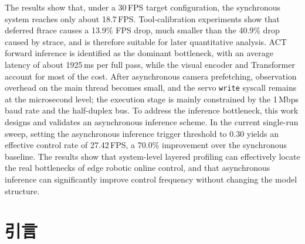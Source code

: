 \documentclass[12pt, a4paper, fontset=macnew]{ctexart}
\begin{document}
The results show that, under a 30\,FPS target configuration, the synchronous system reaches only about 18.7\,FPS. Tool-calibration experiments show that deferred ftrace causes a 13.9\% FPS drop, much smaller than the 40.9\% drop caused by strace, and is therefore suitable for later quantitative analysis. ACT forward inference is identified as the dominant bottleneck, with an average latency of about 1925\,ms per full pass, while the visual encoder and Transformer account for most of the cost. After asynchronous camera prefetching, observation overhead on the main thread becomes small, and the servo \texttt{write} syscall remains at the microsecond level; the execution stage is mainly constrained by the 1\,Mbps baud rate and the half-duplex bus. To address the inference bottleneck, this work designs and validates an asynchronous inference scheme. In the current single-run sweep, setting the asynchronous inference trigger threshold to 0.30 yields an effective control rate of 27.42\,FPS, a 70.0\% improvement over the synchronous baseline. The results show that system-level layered profiling can effectively locate the real bottlenecks of edge robotic online control, and that asynchronous inference can significantly improve control frequency without changing the model structure.

\vspace{1.5em}

\clearpage

\tableofcontents
\clearpage

\mbox{}
\thispagestyle{empty}
\clearpage

\setcounter{page}{1}
\pagestyle{mainmatter}

\section{引言}\label{ch:intro}


\end{document}
